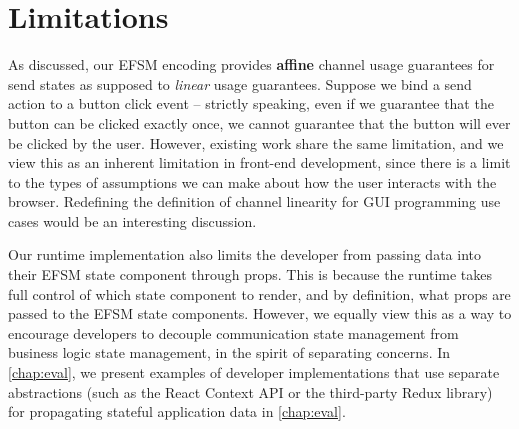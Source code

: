 \section{Limitations}
As discussed, our EFSM encoding provides \textbf{affine} channel
usage guarantees for send states as supposed to \textit{linear} usage
guarantees. Suppose we bind a send action to a
button click event -- strictly speaking,
even if we guarantee that the button can be clicked exactly once,
we cannot guarantee that the button will ever be clicked by the user.
However, existing work \cite{PureScript2019,MVU2020} 
share the same limitation, and we view this as an
inherent limitation in front-end development, since there is
a limit to the types of assumptions we can make about how the
user interacts with the browser.
Redefining the definition of channel linearity 
for GUI programming use cases
would be an interesting discussion.

Our runtime implementation also limits the developer from
passing data into their EFSM state component through props.
This is because the runtime takes full control of which
state component to render, and by definition, what props 
are passed to the EFSM state components.
However, we equally view this as a way to encourage developers
to decouple communication state management from
business logic state management, in the spirit
of separating concerns.
In \cref{chap:eval},
we present examples of developer implementations
that use separate abstractions (such as the React Context API or
the third-party Redux library) for propagating 
stateful application data in \cref{chap:eval}.